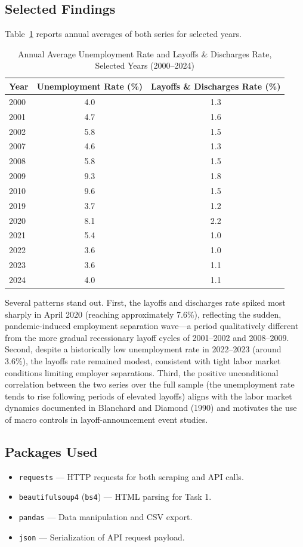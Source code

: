 \documentclass[12pt]{article}
\begin{document}
\subsection*{Selected Findings}

Table~\ref{tab:annual} reports annual averages of both series for selected years.

\begin{table}[h]
\centering
\caption{Annual Average Unemployment Rate and Layoffs \& Discharges Rate,
         Selected Years (2000--2024)}
\label{tab:annual}
\begin{tabular}{lcc}
\toprule
Year & Unemployment Rate (\%) & Layoffs \& Discharges Rate (\%) \\
\midrule
2000 &  4.0 & 1.3 \\
2001 &  4.7 & 1.6 \\
2002 &  5.8 & 1.5 \\
2007 &  4.6 & 1.3 \\
2008 &  5.8 & 1.5 \\
2009 &  9.3 & 1.8 \\
2010 &  9.6 & 1.5 \\
2019 &  3.7 & 1.2 \\
2020 &  8.1 & 2.2 \\
2021 &  5.4 & 1.0 \\
2022 &  3.6 & 1.0 \\
2023 &  3.6 & 1.1 \\
2024 &  4.0 & 1.1 \\
\bottomrule
\end{tabular}
\end{table}

Several patterns stand out. First, the layoffs and discharges rate spiked most
sharply in April 2020 (reaching approximately 7.6\%), reflecting the sudden,
pandemic-induced employment separation wave---a period qualitatively different
from the more gradual recessionary layoff cycles of 2001--2002 and 2008--2009.
Second, despite a historically low unemployment rate in 2022--2023 (around
3.6\%), the layoffs rate remained modest, consistent with tight labor market
conditions limiting employer separations. Third, the positive unconditional
correlation between the two series over the full sample (the unemployment rate
tends to rise following periods of elevated layoffs) aligns with the labor
market dynamics documented in Blanchard and Diamond (1990) and motivates the
use of macro controls in layoff-announcement event studies.

\subsection*{Packages Used}

\begin{itemize}
    \item \texttt{requests} --- HTTP requests for both scraping and API calls.
    \item \texttt{beautifulsoup4} (\texttt{bs4}) --- HTML parsing for Task 1.
    \item \texttt{pandas} --- Data manipulation and CSV export.
    \item \texttt{json} --- Serialization of API request payload.
\end{itemize}
\end{document}
